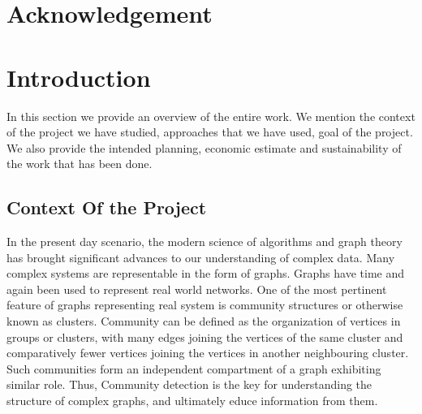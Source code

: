 \newpage
\clearpage
\newpage
\section*{Acknowledgement}

\newpage

\tableofcontents
\newpage


\section{Introduction}
\setcounter{page}{1}
\par In this section	we provide an overview of the entire work. We mention the context of the project we have studied, approaches that we have used, goal of the project. We also provide the intended planning, economic estimate and sustainability of the work that has been done.


\subsection{Context Of the Project}
\par In the present day scenario, the modern science of algorithms and graph theory has brought significant advances to our understanding of complex data. Many complex systems are representable in the form of graphs. Graphs have time and again been used to represent real world networks. One of the most pertinent feature of graphs representing real system is community structures or otherwise known as clusters. Community can be defined as the organization of vertices in groups or clusters, with many edges joining the vertices of the same cluster and comparatively fewer vertices joining the vertices in another neighbouring cluster. Such communities form an independent compartment of a graph exhibiting similar role.
Thus, Community detection is the key for understanding the structure of complex graphs, and ultimately educe information from them.

